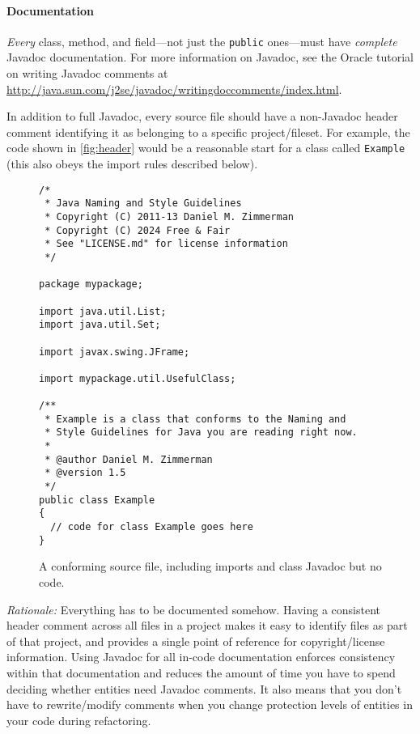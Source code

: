 \paragraph{Documentation}

\emph{Every} class, method, and field---not just the \texttt{public}
ones---must have \emph{complete} Javadoc documentation. For more
information on Javadoc, see the Oracle tutorial on writing Javadoc
comments at
\url{http://java.sun.com/j2se/javadoc/writingdoccomments/index.html}. 

In addition to full Javadoc, every source file should have a
non-Javadoc header comment identifying it as belonging to a specific
project/fileset. For example, the code
shown in \autoref{fig:header} would be a reasonable start for a class
called \texttt{Example} (this also obeys the import rules described below).

\begin{figure}[t]
\begin{center}
\begin{minipage}{0.95\textwidth}
\small
\begin{lstlisting}
/*
 * Java Naming and Style Guidelines
 * Copyright (C) 2011-13 Daniel M. Zimmerman
 * Copyright (C) 2024 Free & Fair
 * See "LICENSE.md" for license information
 */

package mypackage;

import java.util.List;
import java.util.Set;

import javax.swing.JFrame;

import mypackage.util.UsefulClass;

/**
 * Example is a class that conforms to the Naming and 
 * Style Guidelines for Java you are reading right now.
 *
 * @author Daniel M. Zimmerman
 * @version 1.5
 */
public class Example
{
  // code for class Example goes here
}
\end{lstlisting}
\end{minipage}
\vspace{-12pt}
\end{center}
\caption{A conforming source file, including imports and class
  Javadoc but no code.}
\label{fig:header}
\vspace{12pt}
\end{figure}

\emph{Rationale:} Everything has to be documented somehow. Having a
consistent header comment across all files in a project makes it easy
to identify files as part of that project, and provides a single point
of reference for copyright/license information. Using Javadoc for all
in-code documentation enforces consistency within that documentation
and reduces the amount of time you have to spend deciding whether
entities need Javadoc comments. It also means that you don't have to
rewrite/modify comments when you change protection levels of entities
in your code during refactoring.

